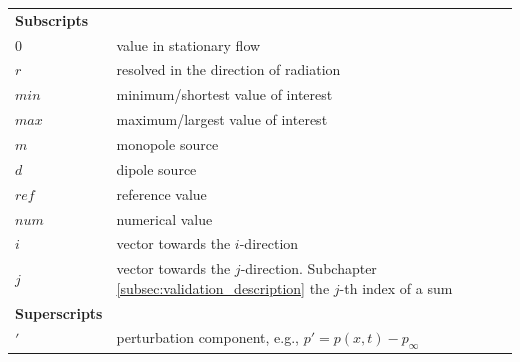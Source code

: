 \begin{longtable}{p{2.5cm} p{13.5cm}}

\textbf{Subscripts} & \\
$0$ & value in stationary flow \\
$r$ & resolved in the direction of radiation \\
$min$ & minimum/shortest value of interest \\
$max$ & maximum/largest value of interest \\
$m$ & monopole source \\
$d$ & dipole source \\
$ref$ & reference value \\
$num$ & numerical value \\
$i$ & vector towards the $i$-direction \\ 
$j$ & vector towards the $j$-direction. Subchapter \ref{subsec:validation_description} the $j$-th index of a sum \\


\textbf{Superscripts} & \\
$'$ & perturbation component, e.g., $p' = p(x,t) - p_{\infty}$ \\

\end{longtable}
